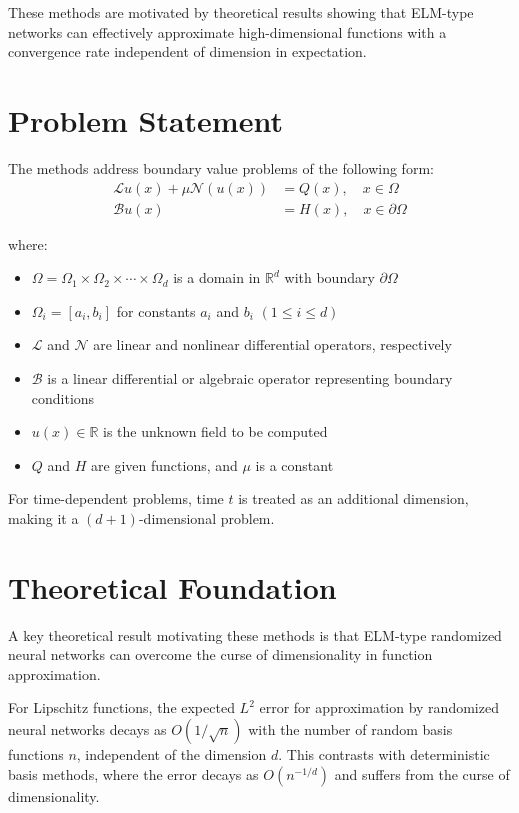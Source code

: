 \documentclass[11pt]{article}
\begin{document}
These methods are motivated by theoretical results showing that ELM-type networks can effectively approximate high-dimensional functions with a convergence rate independent of dimension in expectation.

\section{Problem Statement}

The methods address boundary value problems of the following form:
\begin{align}
    \mathcal{L}u(x) + \mu\mathcal{N}(u(x)) &= Q(x), \quad x \in \Omega\\
    \mathcal{B}u(x) &= H(x), \quad x \in \partial\Omega
\end{align}

where:
\begin{itemize}
    \item $\Omega = \Omega_1 \times \Omega_2 \times \cdots \times \Omega_d$ is a domain in $\mathbb{R}^d$ with boundary $\partial\Omega$
    \item $\Omega_i = [a_i, b_i]$ for constants $a_i$ and $b_i$ $(1 \leq i \leq d)$
    \item $\mathcal{L}$ and $\mathcal{N}$ are linear and nonlinear differential operators, respectively
    \item $\mathcal{B}$ is a linear differential or algebraic operator representing boundary conditions
    \item $u(x) \in \mathbb{R}$ is the unknown field to be computed
    \item $Q$ and $H$ are given functions, and $\mu$ is a constant
\end{itemize}

For time-dependent problems, time $t$ is treated as an additional dimension, making it a $(d+1)$-dimensional problem.

\section{Theoretical Foundation}

A key theoretical result motivating these methods is that ELM-type randomized neural networks can overcome the curse of dimensionality in function approximation.

For Lipschitz functions, the expected $L^2$ error for approximation by randomized neural networks decays as $O(1/\sqrt{n})$ with the number of random basis functions $n$, independent of the dimension $d$. This contrasts with deterministic basis methods, where the error decays as $O(n^{-1/d})$ and suffers from the curse of dimensionality.
\end{document}
